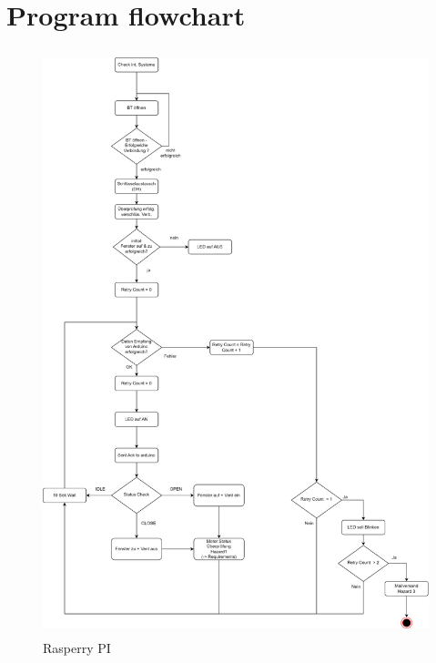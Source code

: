\section{Program flowchart}
\label{chapter3}


\begin{figure}[h]
	\includegraphics[height=170mm,left]{images/ablaufdiag_pi.jpg}
	\centering
	\caption{Rasperry PI}
	\label{fig:system}
\end{figure}

